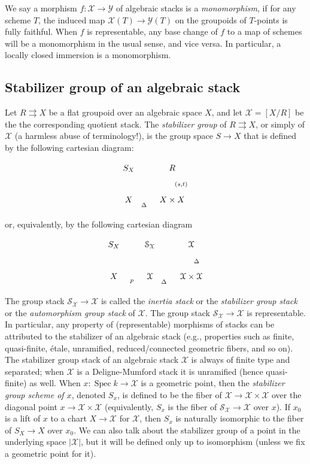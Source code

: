\documentclass{amsart}
\theoremstyle{definition}
\theoremstyle{remark}
\theoremstyle{remark}
\newcommand{\X}{\mathcal{X}}
\newcommand{\Y}{\mathcal{Y}}
\newcommand{\x}{\times}
\newcommand{\st}[1]{\stackrel{#1}{\rightrightarrows}}
\let\:=\colon
\newcommand{\Spec}{\operatorname{Spec}}
\begin{document}
We say a morphism $f \: \X \to \Y$ of algebraic stacks is a {\em
monomorphism}, if for any scheme $T$, the induced map $\X(T) \to
\Y(T)$ on the groupoids of $T$-points is fully faithful. When $f$
is representable, any base change of $f$ to a map of schemes will
be a monomorphism in the usual sense, and vice versa. In
particular, a locally closed immersion is a monomorphism.

\subsection{Stabilizer group of an algebraic stack}{\label{S:Stab}}

Let $R \st{} X$ be a flat groupoid over an algebraic space $X$,
and let $\X=[X/R]$ be the the corresponding quotient stack. The
{\em stabilizer group} of $R \st{} X$, or simply of $\X$ (a
harmless abuse of terminology!), is the group space  $S \to X$
that is defined by the following cartesian diagram:


$$\xymatrix{ S_X \ar[r] \ar[d] & R \ar[d]^{(s,t)} \\
             X \ar[r]_(0.35)\Delta & X \x X}$$

\noindent or, equivalently, by the following cartesian diagram

$$\xymatrix{S_X \ar[r] \ar[d] & \mathcal{S}_{\X} \ar[r] \ar[d] &
\X \ar[d]^{\Delta} \\
          X \ar[r]_p & \X \ar[r]_(.34){\Delta} & \X \x \X}$$

\noindent The group stack $\mathcal{S}_{\X} \to \X$ is called the
{\em inertia stack} or the {\em stabilizer group stack} or the
{\em automorphism group stack} of $\X$. The group stack
$\mathcal{S}_{\X} \to \X$ is representable. In particular, any
property of (representable) morphisms of stacks can be attributed
to the stabilizer of an algebraic stack (e.g., properties such as
finite, quasi-finite, \'{e}tale, unramified, reduced/connected
geometric fibers, and so on). The stabilizer group stack of an
algebraic stack $\X$ is always of finite type and separated;  when
$\X$ is a Deligne-Mumford stack it is unramified (hence
quasi-finite) as well.  When $x \: \Spec k \to \X$ is a geometric
point, then the {\em stabilizer group scheme of $x$}, denoted
$S_x$, is defined to be the fiber of $\X \to \X \x \X$ over the
diagonal point $x \to \X \x \X$ (equivalently, $S_x$ is the fiber
of $\mathcal{S}_{\X} \to \X$ over $x$). If $x_0$ is a lift of $x$
to a chart $X \to \X$ for $\X$, then $S_x$ is naturally isomorphic
to the fiber of $S_X \to X$ over $x_0$. We can also talk about the
stabilizer group of a point in the underlying space $|\X|$, but it
will be defined only up to isomorphism (unless we fix a geometric
point for it).
\end{document}
